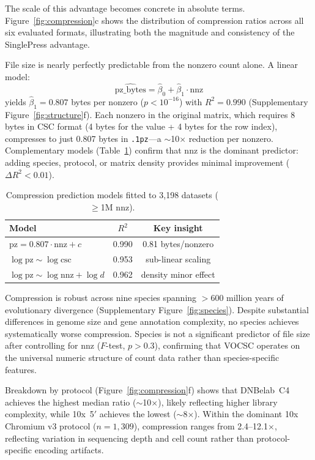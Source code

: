 \documentclass[10pt,twocolumn,letterpaper]{article}
\begin{document}
The scale of this advantage becomes concrete in absolute terms.
Figure~\ref{fig:compression}c shows the distribution of compression ratios across all six evaluated formats, illustrating both the magnitude and consistency of the SinglePress advantage.

File size is nearly perfectly predictable from the nonzero count alone.
A linear model:
\begin{equation}
\widehat{\text{pz\_bytes}} = \hat\beta_0 + \hat\beta_1 \cdot \text{nnz}
\label{eq:model}
\end{equation}
yields $\hat\beta_1 = 0.807$ bytes per nonzero ($p < 10^{-16}$) with $R^2 = 0.990$ (Supplementary Figure~\ref{fig:structure}f).
Each nonzero in the original matrix, which requires 8 bytes in CSC format (4 bytes for the value + 4 bytes for the row index), compresses to just 0.807 bytes in \texttt{.1pz}---a $\sim$10$\times$ reduction per nonzero.
Complementary models (Table~\ref{tab:models}) confirm that nnz is the dominant predictor: adding species, protocol, or matrix density provides minimal improvement ($\Delta R^2 < 0.01$).

\begin{table}[t]
\centering
\caption{Compression prediction models fitted to 3{,}198 datasets ($\geq$1M nnz).}
\label{tab:models}
\footnotesize
\begin{tabular}{lcc}
\toprule
Model & $R^2$ & Key insight \\
\midrule
$\text{pz} = 0.807 \cdot \text{nnz} + c$      & 0.990 & 0.81 bytes/nonzero \\
$\log\text{pz} \sim \log\text{csc}$            & 0.953 & sub-linear scaling \\
$\log\text{pz} \sim \log\text{nnz} + \log d$   & 0.962 & density minor effect \\
\bottomrule
\end{tabular}
\end{table}

Compression is robust across nine species spanning $>$600 million years of evolutionary divergence (Supplementary Figure~\ref{fig:species}).
Despite substantial differences in genome size and gene annotation complexity, no species achieves systematically worse compression.
Species is not a significant predictor of file size after controlling for nnz ($F$-test, $p > 0.3$), confirming that VOCSC operates on the universal numeric structure of count data rather than species-specific features.

Breakdown by protocol (Figure~\ref{fig:compression}f) shows that DNBelab~C4 achieves the highest median ratio ($\sim$10$\times$), likely reflecting higher library complexity, while 10x~5$'$ achieves the lowest ($\sim$8$\times$).
Within the dominant 10x Chromium v3 protocol ($n = 1{,}309$), compression ranges from 2.4--12.1$\times$, reflecting variation in sequencing depth and cell count rather than protocol-specific encoding artifacts.
\end{document}
